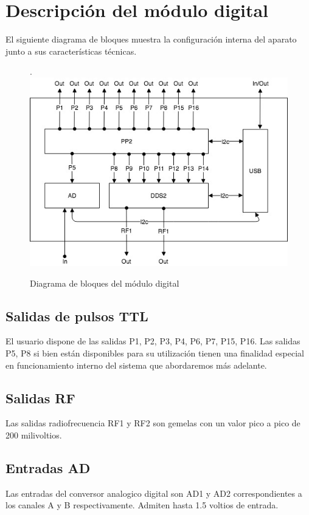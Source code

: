 \section{Descripci\'on del m\'odulo digital}

El siguiente diagrama de bloques muestra la configuraci\'on interna 
del aparato junto a sus caracter\'isticas t\'ecnicas.

\begin{figure}[!htb].
    \includegraphics[width=\linewidth]{../figures/d6.jpg}
    \caption{Diagrama de bloques del m\'odulo digital}
    \label{fig:d6}
\end{figure}

\subsection{Salidas de pulsos TTL}
El usuario dispone de las salidas P1, P2, P3, P4, P6, P7, P15, P16. 
Las salidas P5, P8 si bien est\'an disponibles para su utilizaci\'on tienen 
una finalidad especial en funcionamiento interno del sistema que abordaremos m\'as 
adelante.

\subsection{Salidas RF}
Las salidas radiofrecuencia RF1 y RF2 son gemelas con un valor pico a pico de 200 milivoltios.

\subsection{Entradas AD}
Las entradas del conversor analogico digital son AD1 y AD2 correspondientes a los canales A y B respectivamente.
Admiten hasta 1.5 voltios de entrada.

\newpage
